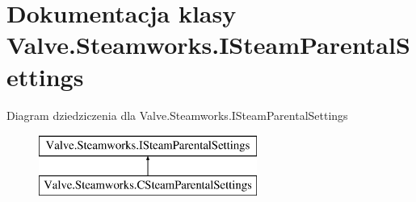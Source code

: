 \hypertarget{class_valve_1_1_steamworks_1_1_i_steam_parental_settings}{}\section{Dokumentacja klasy Valve.\+Steamworks.\+I\+Steam\+Parental\+Settings}
\label{class_valve_1_1_steamworks_1_1_i_steam_parental_settings}
Diagram dziedziczenia dla Valve.\+Steamworks.\+I\+Steam\+Parental\+Settings\begin{figure}[H]
\begin{center}
\leavevmode
\includegraphics[height=2.000000cm]{class_valve_1_1_steamworks_1_1_i_steam_parental_settings}
\end{center}
\end{figure}
